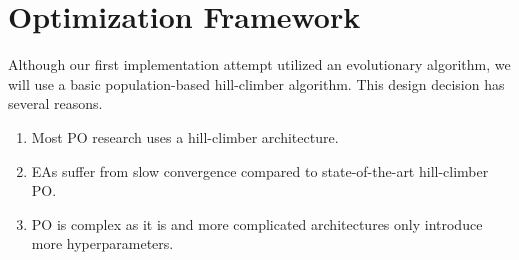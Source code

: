 \section{Optimization Framework}
Although our first implementation attempt utilized an evolutionary algorithm, we will use a basic population-based hill-climber algorithm.
This design decision has several reasons.
\begin{enumerate}
    \item Most PO research uses a hill-climber architecture.
    \item EAs suffer from slow convergence compared to state-of-the-art hill-climber PO\cite{xiang2025selfsupervisedpromptoptimization}.
    \item PO is complex as it is and more complicated architectures only introduce more hyperparameters.
\end{enumerate}


